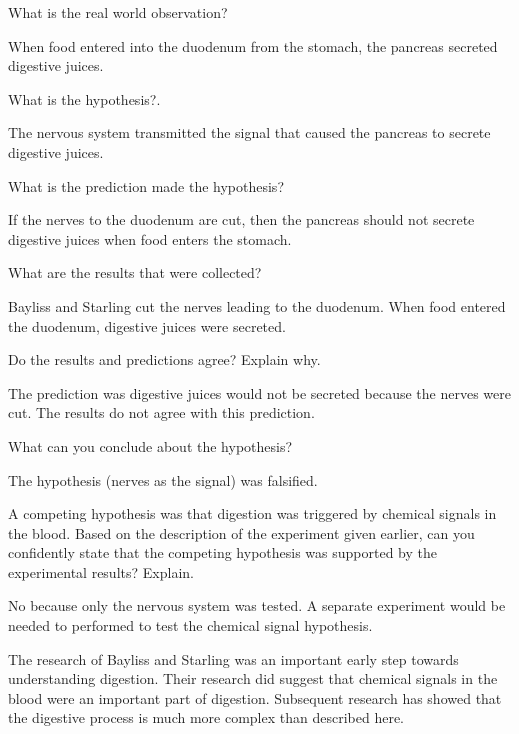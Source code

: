 \documentclass[12pt]{exam}
\newcommand*\AnswerBox[2]{%
    \parbox[t][#1]{0.92\textwidth}{%
    \begin{solution}#2\end{solution}}
    \vspace*{\stretch{1}}
}
\begin{document}
\begin{questions}

\question
What is the real world observation?

\AnswerBox{5\baselineskip}{%
When food entered into the duodenum from the stomach, the pancreas
secreted digestive juices.}

\question
What is the hypothesis?.

\AnswerBox{5\baselineskip}{%
The nervous system transmitted the signal that caused the pancreas
to secrete digestive juices.}



\question
What is the prediction made the hypothesis?

\AnswerBox{5\baselineskip}{%
If the nerves to the duodenum are cut, then the pancreas
should not secrete digestive juices when food enters the stomach.}

\newpage

\question
What are the results that were collected?

\AnswerBox{5\baselineskip}{%
Bayliss and Starling cut the nerves leading to the duodenum. When food
entered the duodenum, digestive juices were secreted.}

\question
Do the results and predictions agree? Explain why.

\AnswerBox{5\baselineskip}{%
The prediction was digestive juices would not be secreted
because the nerves were cut. The results do not agree with this prediction. }

\question
What can you conclude about the hypothesis?

\AnswerBox{5\baselineskip}{%
The hypothesis (nerves as the signal) was falsified.}

\question[Checkout]
A competing hypothesis was that digestion was triggered by chemical signals in the blood. Based on the description of the experiment given earlier, can you confidently state that the competing hypothesis was supported by the experimental results? Explain.

\AnswerBox{7\baselineskip}{%
No because only the nervous system was tested. A separate experiment would be needed to performed to test the chemical signal hypothesis.}

\end{questions}

The research of Bayliss and Starling was an important early step towards understanding digestion. Their research did suggest that chemical signals in the blood were an important part of digestion. Subsequent research has showed that the digestive process is much more complex than described here. 
\end{document}
